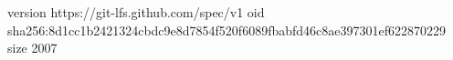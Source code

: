 version https://git-lfs.github.com/spec/v1
oid sha256:8d1cc1b2421324cbdc9e8d7854f520f6089fbabfd46c8ae397301ef622870229
size 2007

